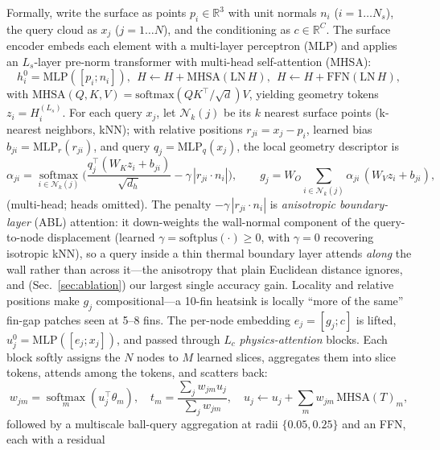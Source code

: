 \documentclass[conference]{IEEEtran}
\begin{document}
Formally, write the surface as points $p_i\in\mathbb{R}^3$ with unit normals $n_i$ ($i{=}1{\dots}N_s$),
the query cloud as $x_j$ ($j{=}1{\dots}N$), and the conditioning as $c\in\mathbb{R}^C$. The surface
encoder embeds each element with a multi-layer perceptron (MLP) and applies an $L_s$-layer pre-norm transformer with multi-head
self-attention (MHSA):
\begin{equation}
h_i^0=\mathrm{MLP}([p_i;n_i]),\ \ H\!\leftarrow\!H+\mathrm{MHSA}(\mathrm{LN}\,H),\ \ H\!\leftarrow\!H+\mathrm{FFN}(\mathrm{LN}\,H),
\end{equation}
with $\mathrm{MHSA}(Q,K,V)=\mathrm{softmax}(QK^\top/\sqrt{d})V$, yielding geometry tokens $z_i=H_i^{(L_s)}$.
For each query $x_j$, let $\mathcal{N}_k(j)$ be its $k$ nearest surface points (k-nearest neighbors, kNN); with relative positions
$r_{ji}=x_j-p_i$, learned bias $b_{ji}=\mathrm{MLP}_r(r_{ji})$, and query $q_j=\mathrm{MLP}_q(x_j)$, the
local geometry descriptor is
\begin{equation}
\alpha_{ji}=\operatorname*{softmax}_{i\in\mathcal{N}_k(j)}\Big(\frac{q_j^\top(W_K z_i+b_{ji})}{\sqrt{d_h}}-\gamma\,|r_{ji}\!\cdot\!n_i|\Big),\qquad
g_j=W_O\!\!\sum_{i\in\mathcal{N}_k(j)}\!\!\alpha_{ji}\,(W_V z_i+b_{ji}),
\end{equation}
(multi-head; heads omitted). The penalty $-\gamma\,|r_{ji}\!\cdot\!n_i|$ is \emph{anisotropic
boundary-layer} (ABL) attention: it down-weights the wall-normal component of the query-to-node
displacement (learned $\gamma=\mathrm{softplus}(\cdot)\ge 0$, with $\gamma=0$ recovering isotropic kNN),
so a query inside a thin thermal boundary layer attends \emph{along} the wall rather than across it---the
anisotropy that plain Euclidean distance ignores, and (Sec.~\ref{sec:ablation}) our largest single accuracy
gain. Locality and relative positions make $g_j$ compositional---a 10-fin heatsink is locally ``more of the
same'' fin-gap patches seen at 5--8 fins. The per-node embedding
$e_j=[g_j;c]$ is lifted, $u_j^0=\mathrm{MLP}([e_j;x_j])$, and passed through $L_c$ \emph{physics-attention}
blocks. Each block softly assigns the $N$ nodes to $M$ learned slices, aggregates them into slice tokens,
attends among the tokens, and scatters back:
\begin{equation}
w_{jm}=\operatorname*{softmax}_m(u_j^\top\theta_m),\quad
t_m=\frac{\sum_j w_{jm}u_j}{\sum_j w_{jm}},\quad
u_j\leftarrow u_j+\sum_m w_{jm}\,\mathrm{MHSA}(T)_m,
\end{equation}
followed by a multiscale ball-query aggregation at radii $\{0.05,0.25\}$ and an FFN, each with a residual
\end{document}
